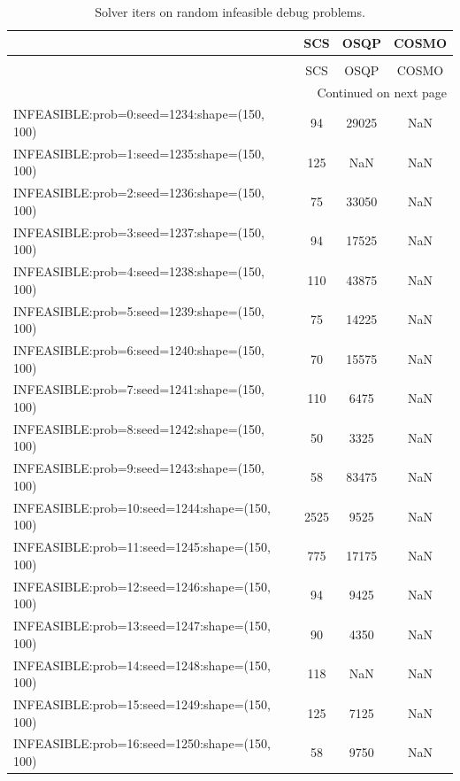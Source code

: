 \begin{longtable}{lccc}
\caption{Solver iters on random infeasible debug problems.}
\label{t-random infeasible debug-iters}\\
\toprule
{} &   SCS &  OSQP &  COSMO \\
\midrule
\endfirsthead
\caption[]{Solver iters on random infeasible debug problems.} \\
\toprule
{} &   SCS &  OSQP &  COSMO \\
\midrule
\endhead
\midrule
\multicolumn{4}{r}{{Continued on next page}} \\
\midrule
\endfoot

\bottomrule
\endlastfoot
INFEASIBLE:prob=0:seed=1234:shape=(150, 100)   &    94 & 29025 &    NaN \\
INFEASIBLE:prob=1:seed=1235:shape=(150, 100)   &   125 &   NaN &    NaN \\
INFEASIBLE:prob=2:seed=1236:shape=(150, 100)   &    75 & 33050 &    NaN \\
INFEASIBLE:prob=3:seed=1237:shape=(150, 100)   &    94 & 17525 &    NaN \\
INFEASIBLE:prob=4:seed=1238:shape=(150, 100)   &   110 & 43875 &    NaN \\
INFEASIBLE:prob=5:seed=1239:shape=(150, 100)   &    75 & 14225 &    NaN \\
INFEASIBLE:prob=6:seed=1240:shape=(150, 100)   &    70 & 15575 &    NaN \\
INFEASIBLE:prob=7:seed=1241:shape=(150, 100)   &   110 &  6475 &    NaN \\
INFEASIBLE:prob=8:seed=1242:shape=(150, 100)   &    50 &  3325 &    NaN \\
INFEASIBLE:prob=9:seed=1243:shape=(150, 100)   &    58 & 83475 &    NaN \\
INFEASIBLE:prob=10:seed=1244:shape=(150, 100)  &  2525 &  9525 &    NaN \\
INFEASIBLE:prob=11:seed=1245:shape=(150, 100)  &   775 & 17175 &    NaN \\
INFEASIBLE:prob=12:seed=1246:shape=(150, 100)  &    94 &  9425 &    NaN \\
INFEASIBLE:prob=13:seed=1247:shape=(150, 100)  &    90 &  4350 &    NaN \\
INFEASIBLE:prob=14:seed=1248:shape=(150, 100)  &   118 &   NaN &    NaN \\
INFEASIBLE:prob=15:seed=1249:shape=(150, 100)  &   125 &  7125 &    NaN \\
INFEASIBLE:prob=16:seed=1250:shape=(150, 100)  &    58 &  9750 &    NaN \\

\end{longtable}

